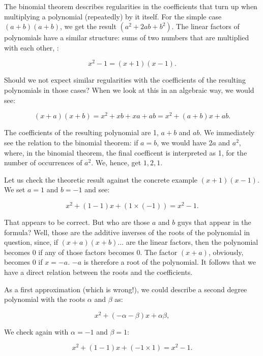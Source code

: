 \documentclass[tikz]{scrreprt}
\begin{document}
The binomial theorem describes regularities 
in the coefficients that turn up
when multiplying a polynomial (repeatedly) by it itself.
For the simple case $(a+b)(a+b)$, we get the result
$(a^2 + 2ab + b^2)$. The linear factors of polynomials
have a similar structure: sums of two numbers that are
multiplied with each other, \eg:

\begin{equation}
x^2 - 1 = (x+1)(x-1).
\end{equation}

Should we not expect similar regularities
with the coefficients of the resulting polynomials
in those cases? When we look at this in an algebraic
way, we would see:

\begin{equation}
(x+a)(x+b) = x^2+xb+xa+ab = x^2 + (a+b)x + ab.
\end{equation}

The coefficients of the resulting polynomial are
1, $a+b$ and $ab$. We immediately see the relation
to the binomial theorem:
if $a=b$, we would have $2a$ and $a^2$, where,
in the binomial theorem, the final coefficent is
interpreted as 1, for the number of occurrences of
$a^2$. We, hence, get $1, 2, 1$.

Let us check the theoretic result against
the concrete example $(x+1)(x-1)$. We set
$a=1$ and $b=-1$ and see:

\begin{equation}
x^2 + (1-1)x + (1\times (-1)) = x^2 - 1.
\end{equation}

That appears to be correct. But who are 
those $a$ and $b$ guys that appear in
the formula? Well, those are the additive
inverses of the roots of the polynomial in
question, since, if $(x+a)(x+b)\dots$ are the linear
factors, then the polynomial becomes 0 if any
of those factors becomes 0. The factor $(x+a)$,
obviously, becomes 0 if $x=-a$. $-a$ is therefore
a root of the polynomial. It follows that we
have a direct relation between the roots and
the coefficients.

As a first approximation (which is wrong!),
we could describe a second degree polynomial 
with the roots
$\alpha$ and $\beta$ as:

\[
x^2 + (-\alpha-\beta)x + \alpha\beta,
\]

We check again with $\alpha = -1$ and $\beta=1$:

\begin{equation}
x^2 + (1-1)x + (-1\times 1) = x^2 - 1.
\end{equation}
\end{document}

